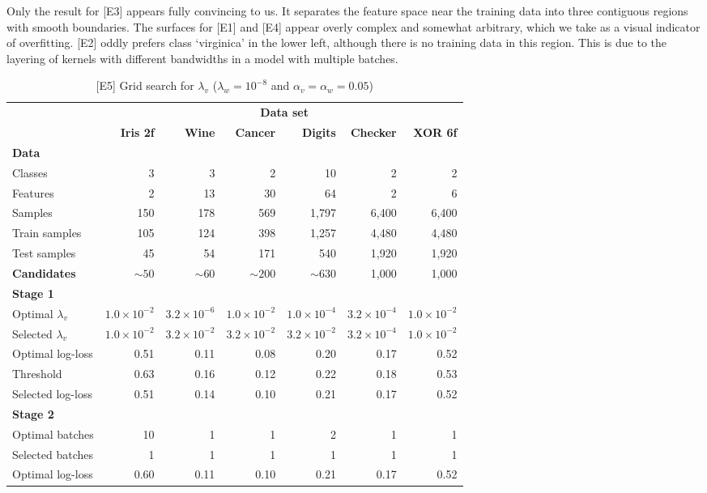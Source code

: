 Only the result for [E3] appears fully convincing to us.
It separates the feature space near the training data into three contiguous regions with smooth boundaries.
The surfaces for [E1] and [E4] appear overly complex and somewhat arbitrary, which we take as a visual indicator of overfitting.
[E2] oddly prefers class `virginica' in the lower left, although there is no training data in this region.
This is due to the layering of kernels with different bandwidths in a model with multiple batches.\par
%
\clearpage
%
\begin{table}
\caption{[E5] Grid search for $\lambda_v$ ($\lambda_w=10^{-8}$ and $\alpha_v=\alpha_w=0.05$)}
\label{tab_e5}
%
\begin{center}
\small
\begin{tabular}{|lrrrrrr|}
\hline
&\multicolumn{6}{c|}{\textbf{\hrulefill\ Data set \hrulefill}}\\
&\textbf{Iris 2f}&\textbf{Wine}&\textbf{Cancer}&\textbf{Digits}&\textbf{Checker}&\textbf{XOR 6f}\\
\multicolumn{7}{|l|}{\textbf{Data}}\\
Classes&3&3&2&10&2&2\\
Features&2&13&30&64&2&6\\
Samples&150&178&569&1,797&6,400&6,400\\
Train samples&105&124&398&1,257&4,480&4,480\\
Test samples&45&54&171&540&1,920&1,920\\
\textbf{Candidates}&$\sim50$&$\sim60$&$\sim200$&$\sim630$&1,000&1,000\\
\multicolumn{7}{|l|}{\textbf{Stage 1}}\\
Optimal $\lambda_v$&$1.0\times10^{-2}$&$3.2\times10^{-6}$&$1.0\times10^{-2}$&$1.0\times10^{-4}$&$3.2\times10^{-4}$&$1.0\times10^{-2}$\\
Selected $\lambda_v$&$1.0\times10^{-2}$&$3.2\times10^{-2}$&$3.2\times10^{-2}$&$3.2\times10^{-2}$&$3.2\times10^{-4}$&$1.0\times10^{-2}$\\
Optimal log-loss&0.51&0.11&0.08&0.20&0.17&0.52\\
Threshold&0.63&0.16&0.12&0.22&0.18&0.53\\
Selected log-loss&0.51&0.14&0.10&0.21&0.17&0.52\\
\multicolumn{7}{|l|}{\textbf{Stage 2}}\\
Optimal batches&10&1&1&2&1&1\\
Selected batches&1&1&1&1&1&1\\
Optimal log-loss&0.60&0.11&0.10&0.21&0.17&0.52\\

\end{tabular}
\end{center}
\end{table}

